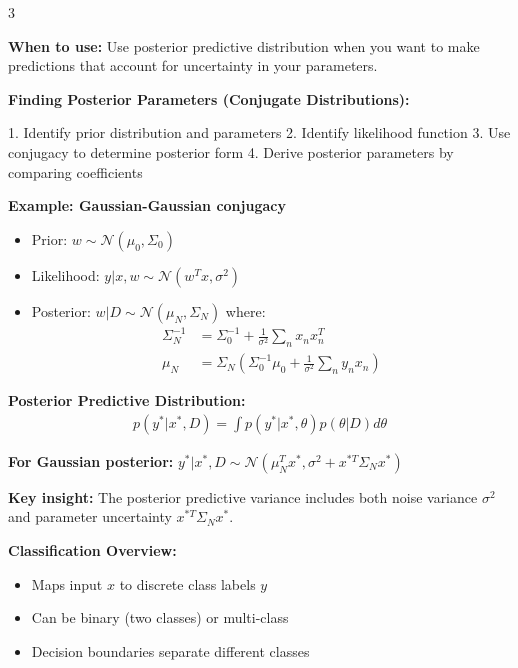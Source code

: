 \documentclass[10pt,landscape]{article}
\begin{document}
\begin{multicols}{3}
\begin{tcolorbox}[breakable, title=1.4 Posterior Parameters \& Predictive Distribution, colback=regression]
\textbf{When to use:} Use posterior predictive distribution when you want to make predictions that account for uncertainty in your parameters.

\textbf{Finding Posterior Parameters (Conjugate Distributions):}

1. Identify prior distribution and parameters
2. Identify likelihood function
3. Use conjugacy to determine posterior form
4. Derive posterior parameters by comparing coefficients

\textbf{Example: Gaussian-Gaussian conjugacy}
\begin{itemize}[leftmargin=*,noitemsep,topsep=0pt]
    \item Prior: $w \sim \mathcal{N}(\mu_0, \Sigma_0)$
    \item Likelihood: $y|x, w \sim \mathcal{N}(w^Tx, \sigma^2)$
    \item Posterior: $w|D \sim \mathcal{N}(\mu_N, \Sigma_N)$ where:
    \begin{align}
    \Sigma_N^{-1} &= \Sigma_0^{-1} + \frac{1}{\sigma^2}\sum_{n}x_nx_n^T\\
    \mu_N &= \Sigma_N(\Sigma_0^{-1}\mu_0 + \frac{1}{\sigma^2}\sum_{n}y_nx_n)
    \end{align}
\end{itemize}

\textbf{Posterior Predictive Distribution:}
\begin{align}
p(y^*|x^*, D) = \int p(y^*|x^*, \theta)p(\theta|D)d\theta
\end{align}

\textbf{For Gaussian posterior:}
$y^*|x^*, D \sim \mathcal{N}(\mu_N^Tx^*, \sigma^2 + x^{*T}\Sigma_Nx^*)$

\textbf{Key insight:} The posterior predictive variance includes both noise variance $\sigma^2$ and parameter uncertainty $x^{*T}\Sigma_Nx^*$.
\end{tcolorbox}

\begin{tcolorbox}[breakable, title=2. Classification Concepts, colback=classification]
\textbf{Classification Overview:}
\begin{itemize}[leftmargin=*,noitemsep,topsep=0pt]
    \item Maps input $x$ to discrete class labels $y$
    \item Can be binary (two classes) or multi-class
    \item Decision boundaries separate different classes
\end{itemize}


\end{tcolorbox}
\end{multicols}
\end{document}

